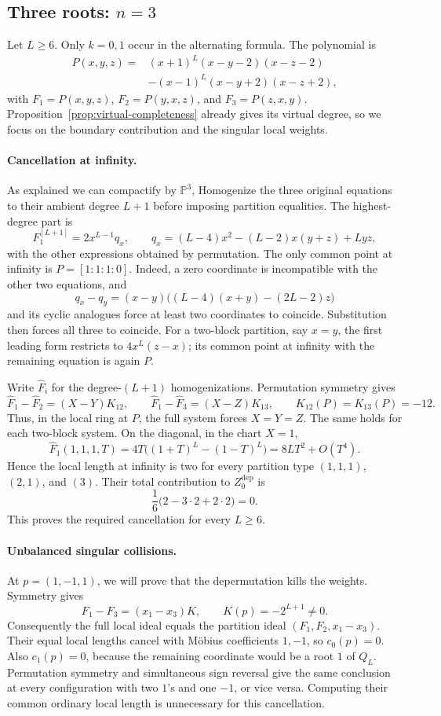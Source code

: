 \documentclass[11pt]{article}
\theoremstyle{definition}
\begin{document}
\subsection{Three roots: $n=3$}
\label{sec:n3-infinity}
Let $L\ge6$. Only $k=0,1$ occur in the alternating formula.
The polynomial is
\[
 \begin{aligned}
 P(x,y,z)={}&(x+1)^L(x-y-2)(x-z-2)\\
 &-(x-1)^L(x-y+2)(x-z+2),
 \end{aligned}
\]
with $F_1=P(x,y,z)$, $F_2=P(y,x,z)$, and $F_3=P(z,x,y)$.
Proposition~\ref{prop:virtual-completeness} already gives its virtual
degree, so we focus on the boundary contribution and the singular
local weights.

\paragraph{Cancellation at infinity.}
As explained we can compactify by $\mathbb{P}^3$, Homogenize the three original equations to their ambient degree
$L+1$ before imposing partition equalities. The highest-degree part is
\[
 F_1^{[L+1]}=2x^{L-1}q_x,\qquad
 q_x=(L-4)x^2-(L-2)x(y+z)+Lyz,
\]
with the other expressions obtained by permutation. The only common
point at infinity is $P=[1:1:1:0]$. Indeed, a zero coordinate is
incompatible with the other two equations, and
\[
 q_x-q_y=(x-y)\bigl((L-4)(x+y)-(2L-2)z\bigr)
\]
and its cyclic analogues force at least two coordinates to coincide.
Substitution then forces all three to coincide. For a two-block
partition, say $x=y$, the first leading form restricts to
$4x^L(z-x)$; its common point at infinity with the remaining equation
is again $P$.

Write $\widehat F_i$ for the degree-$(L+1)$ homogenizations.
Permutation symmetry gives
\[
 \widehat F_1-\widehat F_2=(X-Y)K_{12},\qquad
 \widehat F_1-\widehat F_3=(X-Z)K_{13},\qquad
 K_{12}(P)=K_{13}(P)=-12.
\]
Thus, in the local ring at $P$, the full system forces $X=Y=Z$.
The same holds for each two-block system. On the diagonal, in the
chart $X=1$,
\[
 \widehat F_1(1,1,1,T)
 =4T\bigl((1+T)^L-(1-T)^L\bigr)
 =8LT^2+O(T^4).
\]
Hence the local length at infinity is two for every partition type
$(1,1,1)$, $(2,1)$, and $(3)$. Their total contribution to
$Z^{\mathrm{dep}}_0$ is
\[
 \frac16\bigl(2-3\cdot2+2\cdot2\bigr)=0.
\]
This proves the required cancellation for every $L\ge6$.

\paragraph{Unbalanced singular collisions.}
At $p=(1,-1,1)$, we will prove that the depermutation kills the weights. Symmetry gives
\[
 F_1-F_3=(x_1-x_3)K,\qquad K(p)=-2^{L+1}\ne0.
\]
Consequently the full local ideal equals the partition ideal
$(F_1,F_2,x_1-x_3)$. Their equal local lengths cancel with M\"obius
coefficients $1,-1$, so $c_0(p)=0$. Also $c_1(p)=0$, because the
remaining coordinate would be a root $1$ of $Q_L$. Permutation symmetry
and simultaneous sign reversal give the same conclusion at every
configuration with two $1$'s and one $-1$, or vice versa. Computing their
common ordinary local length is unnecessary for this cancellation.
\end{document}

